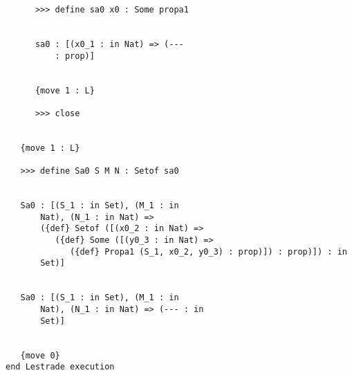 \documentclass{article}
\begin{document}
\begin{verbatim}
      >>> define sa0 x0 : Some propa1


      sa0 : [(x0_1 : in Nat) => (--- 
          : prop)]


      {move 1 : L}

      >>> close


   {move 1 : L}

   >>> define Sa0 S M N : Setof sa0


   Sa0 : [(S_1 : in Set), (M_1 : in 
       Nat), (N_1 : in Nat) => 
       ({def} Setof ([(x0_2 : in Nat) => 
          ({def} Some ([(y0_3 : in Nat) => 
             ({def} Propa1 (S_1, x0_2, y0_3) : prop)]) : prop)]) : in 
       Set)]


   Sa0 : [(S_1 : in Set), (M_1 : in 
       Nat), (N_1 : in Nat) => (--- : in 
       Set)]


   {move 0}
end Lestrade execution
\end{verbatim}
\end{document}
